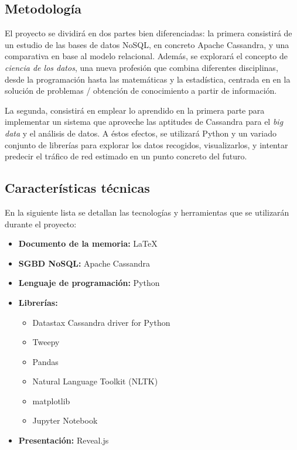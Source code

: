 \subsection{Metodología}
\label{subsec:metodologia}

El proyecto se dividirá en dos partes bien diferenciadas: la primera consistirá
de un estudio de las bases de datos NoSQL, en concreto Apache Cassandra, y una
comparativa en base al modelo relacional. Además, se explorará el concepto de
\emph{ciencia de los datos}, una nueva profesión que combina diferentes
disciplinas, desde la programación hasta las matemáticas y la estadística,
centrada en en la solución de problemas / obtención de conocimiento a partir de información.

La segunda, consistirá en emplear lo aprendido en la primera parte para
implementar un sistema que aproveche las aptitudes de Cassandra para el
\emph{big data} y el análisis de datos. A éstos efectos, se utilizará Python y
un variado conjunto de librerías para explorar los datos recogidos,
visualizarlos, y intentar predecir el tráfico de red estimado en un punto
concreto del futuro.

\subsection{Características técnicas}
\label{subsec:planificació}

En la siguiente lista se detallan las tecnologías y herramientas que se
utilizarán durante el proyecto:

\begin{itemize}
    \item \textbf{Documento de la memoria: } \LaTeX
    \item \textbf{SGBD NoSQL: } Apache Cassandra
    \item \textbf{Lenguaje de programación: } Python 
    \item \textbf{Librerías: } 
      \begin{itemize}
      \item Datastax Cassandra driver for Python
      \item Tweepy
      \item Pandas
      \item Natural Language Toolkit (NLTK)
      \item matplotlib
      \item Jupyter Notebook
      \end{itemize}
    \item \textbf{Presentación: } Reveal.js\\
\end{itemize}

